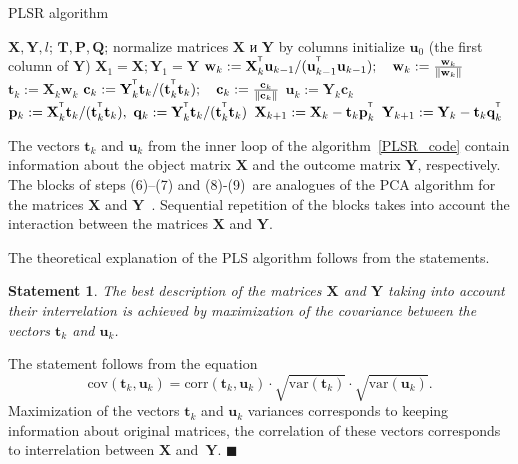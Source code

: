 \documentclass[12pt,twoside]{article}
\newtheorem{statement}{Statement}
\newcommand{\bw}{\mathbf{w}}
\newcommand{\bY}{\mathbf{Y}}
\newcommand{\bX}{\mathbf{X}}
\newcommand{\bu}{\mathbf{u}}
\newcommand{\bt}{\mathbf{t}}
\newcommand{\bp}{\mathbf{p}}
\newcommand{\bq}{\mathbf{q}}
\newcommand{\bc}{\mathbf{c}}
\newcommand{\bP}{\mathbf{P}}
\newcommand{\bT}{\mathbf{T}}
\newcommand{\bQ}{\mathbf{Q}}
\newcommand{\T}{^{\text{\tiny\sffamily\upshape\mdseries T}}}
\begin{document}
\begin{algorithm}[h]
\caption{PLSR algorithm}
\label{PLSR_code}
\begin{algorithmic}[1]
	\REQUIRE $\bX, \bY, l$;
	\ENSURE $\bT, \bP, \bQ$;
	\STATE normalize matrices $\bX$ и $\bY$ by columns
	\STATE initialize $\bu_0$ (the first column of $\bY$)
	\STATE $\bX_1 = \bX; \bY_1 = \bY$
	\REPEAT
	\vspace{0.1cm}
	\STATE $\bw_k := \bX_k^{\T} \bu_{k-1} / (\bu_{k-1}^{\T} \bu_{k-1}); \quad \bw_k: = \frac{\bw_k}{\| \bw_k \|}$
	\vspace{0.1cm}
	\STATE $\bt_k := \bX_k \bw_k$
	\vspace{0.1cm}
	\STATE $\bc_k := \bY_k^{\T} \bt_k / (\bt_k^{\T} \bt_k); \quad \bc_k: = \frac{\bc_k}{\| \bc_k \|}$
	\vspace{0.1cm}
	\STATE $\bu_k := \bY_k \bc_k$
	\UNTIL{$\bt_k$ stabilizes}
	\vspace{0.1cm}
	\STATE $\bp_k:= \bX_k^{\T}\bt_k/(\bt_k^{\T}\bt_k),\ 
	\bq_k := \bY_k^{\T}\bt_k/(\bt_k^{\T}\bt_k)$
	\vspace{0.2cm}
	\STATE $\bX_{k+1} :=  \bX_k - \bt_k \bp_k^{\T}$
	\vspace{0.2cm}
	\STATE $\bY_{k + 1} :=  \bY_k - \bt_k \bq_k^{\T}$ 
	\ENDFOR
\end{algorithmic}
\end{algorithm}

The vectors $\bt_k$ and $\bu_k$ from the inner loop of the algorithm~\ref{PLSR_code} contain information about the object matrix $\bX$ and the outcome matrix $\bY$, respectively. 
The blocks of steps (6)--(7) and (8)-(9)~are analogues of the PCA algorithm for the matrices $\bX$ and $\bY$~\cite{geladi1986partial}. 
Sequential repetition of the blocks takes into account the interaction between the matrices $\bX$ and $\bY$.

The theoretical explanation of the PLS algorithm follows from the statements.
\begin{statement}
The best description of the matrices $\bX$ and $\bY$ taking into account their interrelation is achieved by maximization of the covariance between the vectors $\bt_k$ and $\bu_k$.
\end{statement}
The statement follows from the equation
\[
\text{cov} (\bt_k, \bu_k) = \text{corr} (\bt_k, \bu_k) \cdot \sqrt{\text{var}(\bt_k)} \cdot \sqrt{\text{var}(\bu_k)}.
\]
Maximization of the vectors $\bt_k$ and $\bu_k$ variances corresponds to keeping information about original matrices, the correlation of these vectors corresponds to interrelation between $\bX$ and~$\bY$. $\blacksquare$
\end{document}
